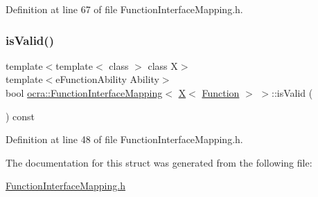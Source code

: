 Definition at line 67 of file Function\+Interface\+Mapping.\+h.

\hypertarget{structocra_1_1FunctionInterfaceMapping_3_01X_3_01Function_01_4_01_4_af951c325ee8497589c3f79b9fcdf003e}{}\label{structocra_1_1FunctionInterfaceMapping_3_01X_3_01Function_01_4_01_4_af951c325ee8497589c3f79b9fcdf003e} 
\subsubsection{\texorpdfstring{is\+Valid()}{isValid()}}
{\footnotesize\ttfamily template$<$template$<$ class $>$ class X$>$ \\
template$<$e\+Function\+Ability Ability$>$ \\
bool \hyperlink{structocra_1_1FunctionInterfaceMapping}{ocra\+::\+Function\+Interface\+Mapping}$<$ \hyperlink{namespaceocra_a436781c7059a0f76027df1c652126260a53f3cfeeb322946db40cd86dfebfb237}{X}$<$ \hyperlink{classocra_1_1Function}{Function} $>$ $>$\+::is\+Valid (\begin{DoxyParamCaption}{ }\end{DoxyParamCaption}) const\hspace{0.3cm}{\ttfamily [inline]}}



Definition at line 48 of file Function\+Interface\+Mapping.\+h.



The documentation for this struct was generated from the following file\+:\begin{DoxyCompactItemize}
\item 
\hyperlink{FunctionInterfaceMapping_8h}{Function\+Interface\+Mapping.\+h}\end{DoxyCompactItemize}
